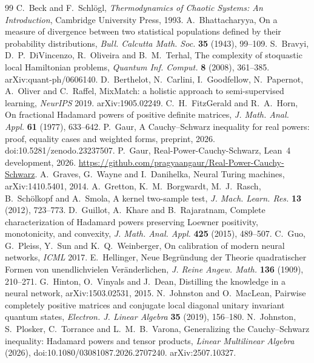 \documentclass[11pt]{article}
\theoremstyle{remark}
\begin{document}
\begin{thebibliography}{99}\small
{} C.~Beck and F.~Schlögl, \emph{Thermodynamics of Chaotic Systems: An Introduction}, Cambridge University Press, 1993.
 A.~Bhattacharyya, On a measure of divergence between two statistical populations defined by their probability distributions, \emph{Bull. Calcutta Math. Soc.} \textbf{35} (1943), 99--109.
 S.~Bravyi, D.~P.~DiVincenzo, R.~Oliveira and B.~M.~Terhal, The complexity of stoquastic local Hamiltonian problems, \emph{Quantum Inf. Comput.} \textbf{8} (2008), 361--385. arXiv:quant-ph/0606140.
 D.~Berthelot, N.~Carlini, I.~Goodfellow, N.~Papernot, A.~Oliver and C.~Raffel, MixMatch: a holistic approach to semi-supervised learning, \emph{NeurIPS} 2019. arXiv:1905.02249.
 C.~H.~FitzGerald and R.~A.~Horn, On fractional Hadamard powers of positive definite matrices, \emph{J. Math. Anal. Appl.} \textbf{61} (1977), 633--642.
 P.~Gaur, A Cauchy--Schwarz inequality for real powers: proof, equality cases and weighted forms, preprint, 2026. doi:10.5281/zenodo.23237507.
 P.~Gaur, Real-Power-Cauchy-Schwarz, Lean~4 development, 2026. \url{https://github.com/pragyaangaur/Real-Power-Cauchy-Schwarz}.
 A.~Graves, G.~Wayne and I.~Danihelka, Neural Turing machines, arXiv:1410.5401, 2014.
 A.~Gretton, K.~M.~Borgwardt, M.~J.~Rasch, B.~Schölkopf and A.~Smola, A kernel two-sample test, \emph{J. Mach. Learn. Res.} \textbf{13} (2012), 723--773.
 D.~Guillot, A.~Khare and B.~Rajaratnam, Complete characterization of Hadamard powers preserving Loewner positivity, monotonicity, and convexity, \emph{J. Math. Anal. Appl.} \textbf{425} (2015), 489--507.
 C.~Guo, G.~Pleiss, Y.~Sun and K.~Q.~Weinberger, On calibration of modern neural networks, \emph{ICML} 2017.
 E.~Hellinger, Neue Begründung der Theorie quadratischer Formen von unendlichvielen Veränderlichen, \emph{J. Reine Angew. Math.} \textbf{136} (1909), 210--271.
 G.~Hinton, O.~Vinyals and J.~Dean, Distilling the knowledge in a neural network, arXiv:1503.02531, 2015.
 N.~Johnston and O.~MacLean, Pairwise completely positive matrices and conjugate local diagonal unitary invariant quantum states, \emph{Electron. J. Linear Algebra} \textbf{35} (2019), 156--180.
 N.~Johnston, S.~Plosker, C.~Torrance and L.~M.~B.~Varona, Generalizing the Cauchy--Schwarz inequality: Hadamard powers and tensor products, \emph{Linear Multilinear Algebra} (2026), doi:10.1080/03081087.2026.2707240. arXiv:2507.10327.

\end{thebibliography}
\end{document}
